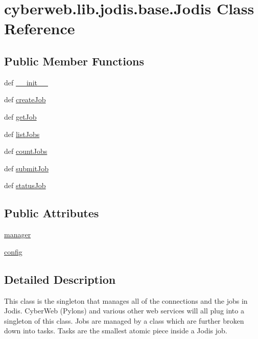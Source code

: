 \hypertarget{classcyberweb_1_1lib_1_1jodis_1_1base_1_1_jodis}{\section{cyberweb.\-lib.\-jodis.\-base.\-Jodis \-Class \-Reference}
\label{classcyberweb_1_1lib_1_1jodis_1_1base_1_1_jodis}
}
\subsection*{\-Public \-Member \-Functions}
\begin{DoxyCompactItemize}
\item 
def \hyperlink{classcyberweb_1_1lib_1_1jodis_1_1base_1_1_jodis_a24d28a92cc48e2192970b7d8e906aac4}{\-\_\-\-\_\-init\-\_\-\-\_\-}
\item 
def \hyperlink{classcyberweb_1_1lib_1_1jodis_1_1base_1_1_jodis_af935dde9f265a5a7eea4c7b7c909627a}{create\-Job}
\item 
def \hyperlink{classcyberweb_1_1lib_1_1jodis_1_1base_1_1_jodis_a2f4ea671e6e63fb1fb687049c6b6cf07}{get\-Job}
\item 
def \hyperlink{classcyberweb_1_1lib_1_1jodis_1_1base_1_1_jodis_a564fe99abc09fb593a9c38f9151b7bf1}{list\-Jobs}
\item 
def \hyperlink{classcyberweb_1_1lib_1_1jodis_1_1base_1_1_jodis_a1ba1b570bb1f12a9a90839539ef00695}{count\-Jobs}
\item 
def \hyperlink{classcyberweb_1_1lib_1_1jodis_1_1base_1_1_jodis_a6b32a750a161c13e5a2c383801bbe269}{submit\-Job}
\item 
def \hyperlink{classcyberweb_1_1lib_1_1jodis_1_1base_1_1_jodis_ade58d1c18d7e171eb50e16dc2cc58cf7}{status\-Job}
\end{DoxyCompactItemize}
\subsection*{\-Public \-Attributes}
\begin{DoxyCompactItemize}
\item 
\hyperlink{classcyberweb_1_1lib_1_1jodis_1_1base_1_1_jodis_ac8fe44add316a51a2d3616fa95cab4f6}{manager}
\item 
\hyperlink{classcyberweb_1_1lib_1_1jodis_1_1base_1_1_jodis_a48c63a8a937fb261b4419f597e63017e}{config}
\end{DoxyCompactItemize}


\subsection{\-Detailed \-Description}
\begin{DoxyVerb}
This class is the singleton that manages all of the connections and the jobs in
Jodis. CyberWeb (Pylons) and various other web services will all plug into a singleton
of this class. Jobs are managed by a class which are further broken down into tasks.
Tasks are the smallest atomic piece inside a Jodis job.
\end{DoxyVerb}
 

